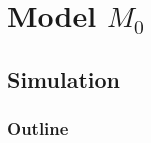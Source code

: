 \documentclass[color=usenames,dvipsnames]{beamer}\usepackage[]{graphicx}\usepackage[]{color}
\begin{document}
\section{Model $M_0$}


\subsection{Simulation}




\begin{frame}
  \frametitle{Outline}
  \Large
  \tableofcontents[currentsection]
\end{frame}
\end{document}
